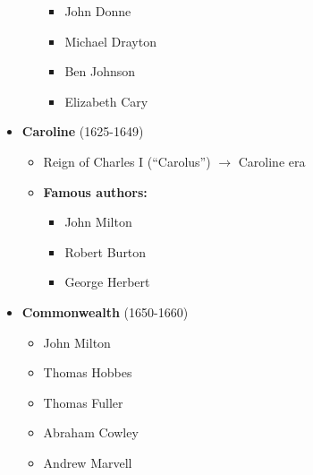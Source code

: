 \documentclass[
  12pt,
  ignorenonframetext,
  progressbar=frametitle]{beamer}
\providecommand{\tightlist}{%
  \setlength{\itemsep}{0pt}\setlength{\parskip}{0pt}}
\begin{document}
\begin{frame}[allowframebreaks]
\begin{itemize}
\begin{itemize}
    \begin{itemize}
    \tightlist
    \item
      John Donne
    \item
      Michael Drayton
    \item
      Ben Johnson
    \item
      Elizabeth Cary
    \end{itemize}
  \end{itemize}
\item
  \textbf{Caroline} (1625-1649)

  \begin{itemize}
  \tightlist
  \item
    Reign of Charles I (``Carolus'') \(\rightarrow\) Caroline era
  \item
    \textbf{Famous authors:}

    \begin{itemize}
    \tightlist
    \item
      John Milton
    \item
      Robert Burton
    \item
      George Herbert
    \end{itemize}
  \end{itemize}
\item
  \textbf{Commonwealth} (1650-1660)

  \begin{itemize}
  \tightlist
  \item
    John Milton
  \item
    Thomas Hobbes
  \item
    Thomas Fuller
  \item
    Abraham Cowley
  \item
    Andrew Marvell
  \end{itemize}
\end{itemize}
\end{frame}
\end{document}
